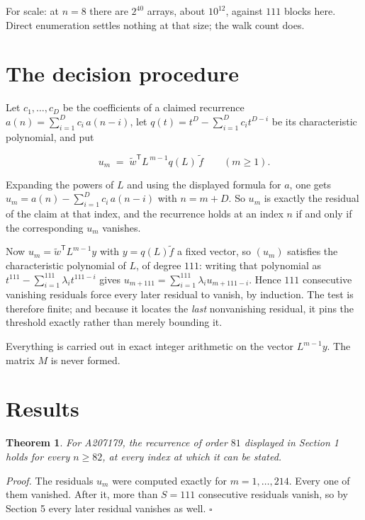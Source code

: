 \documentclass[11pt]{article}
\newtheorem{theorem}{Theorem}
\theoremstyle{definition}
\begin{document}
For scale: at $n = 8$ there are $2^{40}$ arrays, about $10^{12}$, against $111$ blocks here. Direct enumeration settles nothing at that size; the walk count does.

\section{The decision procedure}

Let $c_1,\dots,c_D$ be the coefficients of a claimed recurrence $a(n) = \sum_{i=1}^{D} c_i\,a(n-i)$, let $q(t) = t^{D} - \sum_{i=1}^{D} c_i t^{D-i}$ be its characteristic polynomial, and put

\[u_m \;=\; \tilde w^{\mathsf T} L^{\,m-1} q(L)\,\tilde f \qquad (m \ge 1).\]

Expanding the powers of $L$ and using the displayed formula for $a$, one gets $u_m = a(n) - \sum_{i=1}^{D} c_i\,a(n-i)$ with $n = m + D$. So $u_m$ is exactly the residual of the claim at that index, and the recurrence holds at an index $n$ if and only if the corresponding $u_m$ vanishes.

Now $u_m = \tilde w^{\mathsf T} L^{m-1} y$ with $y = q(L)\tilde f$ a fixed vector, so $(u_m)$ satisfies the characteristic polynomial of $L$, of degree $111$: writing that polynomial as $t^{111} - \sum_{i=1}^{111} \lambda_i t^{111-i}$ gives $u_{m+111} = \sum_{i=1}^{111} \lambda_i u_{m+111-i}$. Hence $111$ consecutive vanishing residuals force every later residual to vanish, by induction. The test is therefore finite; and because it locates the {\itshape last} nonvanishing residual, it pins the threshold exactly rather than merely bounding it.

Everything is carried out in exact integer arithmetic on the vector $L^{m-1}y$. The matrix $M$ is never formed.

\section{Results}

\begin{theorem} For A207179, the recurrence of order $81$ displayed in Section 1 holds for every $n \ge 82$, at every index at which it can be stated.\end{theorem}

{\itshape Proof.} The residuals $u_m$ were computed exactly for $m = 1,\dots,214$. Every one of them vanished. After it, more than $S = 111$ consecutive residuals vanish, so by Section 5 every later residual vanishes as well. $\square$
\end{document}
